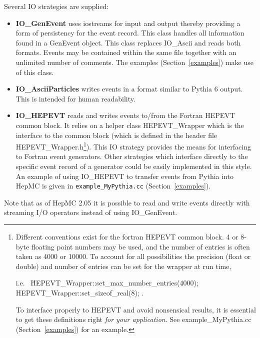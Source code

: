 \documentclass[11pt,letterpaper]{article}
\begin{document}
Several IO strategies are supplied:
\begin{itemize}\setlength{\itemsep}{0pt}
  \item {\bf IO\_GenEvent} uses iostreams for input and output
    thereby providing a form of persistency for the event record. 
    This class handles all information found in a GenEvent object.
    This class replaces IO\_Ascii and reads both formats.
    Events may be contained within the same file together with
    an unlimited number of comments. 
    The examples (Section~\ref{examples}) make use of this class.
  \item {\bf IO\_AsciiParticles} writes events in a format similar to 
     Pythia 6 output.  This is intended for human readability.
  \item {\bf IO\_HEPEVT} reads and writes events to/from the Fortran HEPEVT
    common block. It relies on a helper class HEPEVT\_Wrapper which
    is the interface to the common block
    (which is defined in the header file HEPEVT\_Wrapper.h\footnote{
      Different conventions exist for the fortran HEPEVT common
      block. 4 or 8-byte floating point numbers may be used, and the
      number of entries is often taken as 4000 or 10000. To account for
      all possibilities the precision (float or double) and number of
      entries can be set for the wrapper at run time,
      \begin{tabbing}
      i.e.\ \hspace{1cm} \= HEPEVT\_Wrapper::set\_max\_number\_entries(4000);\\
                         \> HEPEVT\_Wrapper::set\_sizeof\_real(8); 
            \hspace{1cm} .
      \end{tabbing}
      To interface properly to HEPEVT and avoid nonsensical
      results, it is essential to get these definitions right
      {\it for your application}. See example\_MyPythia.cc
      (Section~\ref{examples}) for an example.
      }).
    This IO strategy
    provides the means for interfacing to Fortran event
    generators. Other strategies which interface directly to the
    specific event record of a generator could be easily implemented
    in this style. An example of using IO\_HEPEVT to transfer events
    from Pythia into HepMC is given in \verb!example_MyPythia.cc! 
    (Section~\ref{examples}).
\end{itemize}

Note that as of HepMC 2.05 it is possible to read and write events directly
with streaming I/O operators instead of using IO\_GenEvent.  
\end{document}
